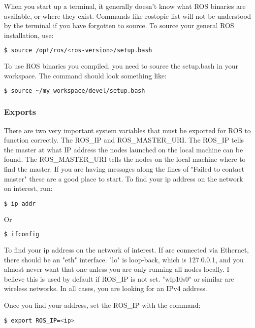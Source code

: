 When you start up a terminal, it generally doesn't know what ROS binaries are available, or where they exist. Commands like rostopic list will not be understood by the terminal if you have forgotten to source. To source your general ROS installation, use: 

\begin{lstlisting}[language=bash]
  $ source /opt/ros/<ros-version>/setup.bash
\end{lstlisting}

To use ROS binaries you compiled, you need to source the setup.bash in your workspace. The command should look something like:

\begin{lstlisting}[language=bash]
  $ source ~/my_workspace/devel/setup.bash
\end{lstlisting}

\subsubsection{Exports}

There are two very important system variables that must be exported for ROS to function correctly. The ROS\_IP and ROS\_MASTER\_URI. The ROS\_IP tells the master at what IP address the nodes launched on the local machine can be found. The ROS\_MASTER\_URI tells the nodes on the local machine where to find the master. If you are having messages along the lines of "Failed to contact master" these are a good place to start. To find your ip address on the network on interest, run:

\begin{lstlisting}[language=bash]
  $ ip addr
\end{lstlisting} 

Or

\begin{lstlisting}[language=bash]
  $ ifconfig
\end{lstlisting} 

To find your ip address on the network of interest. If are connected via Ethernet, there should be an "eth" interface. "lo" is loop-back, which is 127.0.0.1, and you almost never want that one unless you are only running all nodes locally. I believe this is used by default if ROS\_IP is not set. "wlp10s0" or similar are wireless networks. In all cases, you are looking for an IPv4 address.

Once you find your address, set the ROS\_IP with the command:

\begin{lstlisting}[language=bash]
  $ export ROS_IP=<ip>
\end{lstlisting} 

